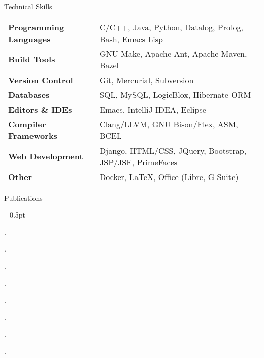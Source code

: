 \documentclass{resume}
\begin{document}

\begin{rSection}{Technical Skills}

{\renewcommand{\arraystretch}{1.3}
\begin{tabular}{ @{} >{\bfseries}l @{\hspace{6ex}} l }

Programming Languages
   & C/C++, Java, Python, Datalog, Prolog, Bash, Emacs Lisp \\

Build Tools
   & GNU Make, Apache Ant, Apache Maven, Bazel \\

Version Control
   & Git, Mercurial, Subversion \\

Databases
   & SQL, MySQL, LogicBlox, Hibernate ORM \\


Editors \& IDEs
   & Emacs, IntelliJ IDEA, Eclipse \\

Compiler Frameworks
   & Clang/LLVM, GNU Bison/Flex, ASM, BCEL \\


Web Development
   & Django, HTML/CSS, JQuery, Bootstrap, JSP/JSF, PrimeFaces \\

Other
   & Docker, \LaTeX{}, Office (Libre, G Suite) \\
\end{tabular}}
\end{rSection}


\begin{rSection}{Publications}
  \begin{rSubsection}{}{}{}{}
    \itemsep +0.5pt %
  \item {}.
  \item {}.
  \item {}.
  \item {}.
  \item {}.
  \item {}.
  \item {}.
  \item {}.
  \end{rSubsection}
\end{rSection}
\end{document}
